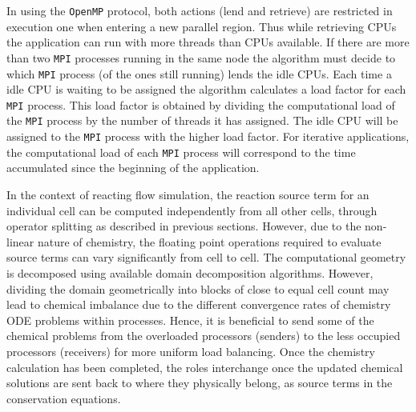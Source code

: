 \documentclass[letterpaper,twocolumn,10pt]{article}
\begin{document}
In using the \texttt{OpenMP} protocol, both actions (lend and retrieve) are restricted in execution one when entering a new parallel region. Thus while retrieving CPUs the application can run with more threads than CPUs available. If there are more than two \texttt{MPI} processes running in the same node the algorithm must decide to which \texttt{MPI} process (of the ones still running) lends the idle CPUs. Each time a idle CPU is waiting to be assigned the algorithm calculates a load factor for each \texttt{MPI} process. This load factor is obtained by dividing the computational load of the \texttt{MPI} process by the number of threads it has assigned. The idle CPU will be assigned to the \texttt{MPI} process with the higher load factor. For iterative applications, the computational load of each \texttt{MPI} process will correspond to the time accumulated since the beginning of the application.

In the context of reacting flow simulation, the reaction source term for an individual cell can be computed independently from all other cells, through operator splitting as described in previous sections. However, due to the non-linear nature of chemistry, the floating point operations required to evaluate source terms can vary significantly from cell to cell. The computational geometry is decomposed using available domain decomposition algorithms. However, dividing the domain geometrically into blocks of close to equal cell count may lead to chemical imbalance due to the different convergence rates of chemistry ODE problems within processes. Hence, it is beneficial to send some of the chemical problems from the overloaded processors (senders) to the less occupied processors (receivers) for more uniform load balancing. Once the chemistry calculation has been completed, the roles interchange once the updated chemical solutions are sent back to where they physically belong, as source terms in the conservation equations.
\end{document}

